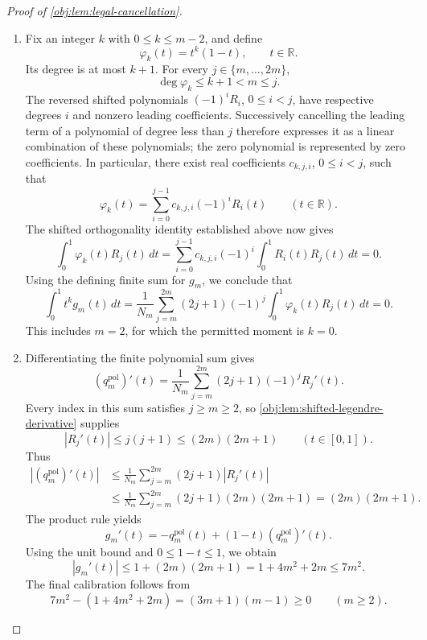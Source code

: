 \documentclass[11pt]{article}
\begin{document}
\begin{proof}[Proof of \cref{obj:lem:legal-cancellation}]
\begin{enumerate}
\item Fix an integer \(k\) with \(0\le k\le m-2\), and define
\[
\varphi_k(t)=t^k(1-t),\qquad t\in\mathbb R.
\]
Its degree is at most \(k+1\). For every \(j\in\{m,\ldots,2m\}\),
\[
\deg\varphi_k\le k+1<m\le j.
\]
The reversed shifted polynomials \((-1)^iR_i\), \(0\le i<j\), have respective degrees \(i\) and nonzero leading coefficients. Successively cancelling the leading term of a polynomial of degree less than \(j\) therefore expresses it as a linear combination of these polynomials; the zero polynomial is represented by zero coefficients. In particular, there exist real coefficients \(c_{k,j,i}\), \(0\le i<j\), such that
\[
\varphi_k(t)=\sum_{i=0}^{j-1}c_{k,j,i}(-1)^iR_i(t)
\qquad(t\in\mathbb R).
\]
The shifted orthogonality identity established above now gives
\[
\int_0^1\varphi_k(t)R_j(t)\,dt
=\sum_{i=0}^{j-1}c_{k,j,i}(-1)^i
\int_0^1R_i(t)R_j(t)\,dt
=0.
\]
Using the defining finite sum for \(g_m\), we conclude that
\[
\int_0^1t^kg_m(t)\,dt
=\frac1{N_m}\sum_{j=m}^{2m}(2j+1)(-1)^j
\int_0^1\varphi_k(t)R_j(t)\,dt
=0.
\]
This includes \(m=2\), for which the permitted moment is \(k=0\).

\item Differentiating the finite polynomial sum gives
\[
(q_m^{\mathrm{pol}})'(t)
=\frac1{N_m}\sum_{j=m}^{2m}(2j+1)(-1)^jR_j'(t).
\]
Every index in this sum satisfies \(j\ge m\ge2\), so \cref{obj:lem:shifted-legendre-derivative} supplies
\[
|R_j'(t)|\le j(j+1)\le(2m)(2m+1)
\qquad(t\in[0,1]).
\]
Thus
\[
\begin{aligned}
|(q_m^{\mathrm{pol}})'(t)|
&\le\frac1{N_m}\sum_{j=m}^{2m}(2j+1)|R_j'(t)|\\
&\le\frac1{N_m}\sum_{j=m}^{2m}(2j+1)(2m)(2m+1)
=(2m)(2m+1).
\end{aligned}
\]
The product rule yields
\[
g_m'(t)=-q_m^{\mathrm{pol}}(t)
+(1-t)(q_m^{\mathrm{pol}})'(t).
\]
Using the unit bound and \(0\le1-t\le1\), we obtain
\[
|g_m'(t)|
\le1+(2m)(2m+1)
=1+4m^2+2m
\le7m^2.
\]
The final calibration follows from
\[
7m^2-(1+4m^2+2m)=(3m+1)(m-1)\ge0
\qquad(m\ge2).
\]


\end{enumerate}
\end{proof}
\end{document}
